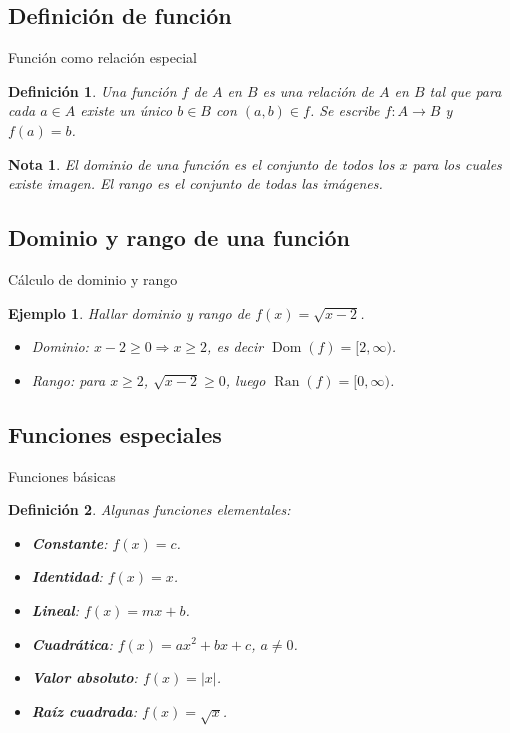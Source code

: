 \documentclass[10pt, spanish]{beamer}
\newtheorem{definicion}{Definición}
\newtheorem{ejemplo}{Ejemplo}
\newtheorem{nota}{Nota}
\begin{document}
	\subsection{Definición de función}
	\begin{frame}{Función como relación especial}
		\begin{definicion}
			Una \textit{función} $f$ de $A$ en $B$ es una relación de $A$ en $B$ tal que para cada $a\in A$ existe un único $b\in B$ con $(a,b)\in f$. Se escribe $f:A\to B$ y $f(a)=b$.
		\end{definicion}
		\begin{nota}
			El dominio de una función es el conjunto de todos los $x$ para los cuales existe imagen. El rango es el conjunto de todas las imágenes.
		\end{nota}
	\end{frame}
	
	\subsection{Dominio y rango de una función}
	\begin{frame}{Cálculo de dominio y rango}
		\begin{ejemplo}
			Hallar dominio y rango de $f(x)=\sqrt{x-2}$.
			\begin{itemize}
				\item Dominio: $x-2\ge 0 \Rightarrow x\ge 2$, es decir $\operatorname{Dom}(f)=[2,\infty)$.
				\item Rango: para $x\ge 2$, $\sqrt{x-2}\ge 0$, luego $\operatorname{Ran}(f)=[0,\infty)$.
			\end{itemize}
		\end{ejemplo}
	\end{frame}
	
	\subsection{Funciones especiales}
	\begin{frame}{Funciones básicas}
		\begin{definicion}
			Algunas funciones elementales:
			\begin{itemize}
				\item \textbf{Constante}: $f(x)=c$.
				\item \textbf{Identidad}: $f(x)=x$.
				\item \textbf{Lineal}: $f(x)=mx+b$.
				\item \textbf{Cuadrática}: $f(x)=ax^2+bx+c$, $a\neq0$.
				\item \textbf{Valor absoluto}: $f(x)=|x|$.
				\item \textbf{Raíz cuadrada}: $f(x)=\sqrt{x}$.
			\end{itemize}
		\end{definicion}
	\end{frame}
	
\end{document}
